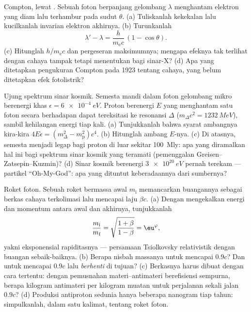 \begin{exercise}[$\star\star\star$]\label{exo:b3:relativistic-dynamics:10}
Compton, lewat . Sebuah foton berpanjang gelombang
$\lambda$ menghantam elektron yang diam lalu terhambur pada sudut
$\theta$. (a) Tuliskanlah kekekalan  lalu kucilkanlah
invarian elektron akhirnya. (b) Turunkanlah
\[
\lambda' - \lambda = \frac{h}{m_{\text{e}}c}\,(1 - \cos\theta) .
\]
(c) Hitunglah $h/m_{\text{e}}c$ dan pergeseran maksimumnya; mengapa
efeknya tak terlihat dengan cahaya tampak tetapi menentukan bagi
sinar-X? (d) Apa yang ditetapkan pengukuran Compton pada 1923 tentang
cahaya, yang belum ditetapkan efek fotolistrik?
\end{exercise}

\begin{exercise}[$\star\star\star$]\label{exo:b3:relativistic-dynamics:11}
Ujung spektrum sinar kosmik. Semesta mandi dalam foton gelombang mikro
berenergi khas $\epsilon = \qty{6e-4}{eV}$. Proton berenergi $E$ yang
menghantam satu foton secara berhadapan dapat tereksitasi ke resonansi
$\Delta$ ($m_\Delta c^2 = \qty{1232}{MeV}$), sambil kehilangan energi
tiap kali. (a) Tunjukkanlah bahwa syarat ambangnya kira-kira $4E\epsilon =
(m_\Delta^2 - m_{\text{p}}^2)c^4$. (b) Hitunglah ambang $E$-nya.
(c) Di atasnya, semesta menjadi legap bagi proton di luar sekitar
\qty{100}{Mly}: apa yang diramalkan hal ini bagi spektrum sinar kosmik
yang teramati (pemenggalan Greisen--Zatsepin--Kuzmin)? (d) Sinar kosmik
berenergi $\qty{3e20}{eV}$ pernah terekam --- partikel ``Oh-My-God'':
apa yang dituntut keberadaannya dari sumbernya?
\end{exercise}

\begin{exercise}[$\star\star\star$]\label{exo:b3:relativistic-dynamics:12}
Roket foton. Sebuah roket bermassa awal $m_{\text{i}}$ memancarkan
buangannya sebagai berkas cahaya terkolimasi lalu mencapai laju $\beta c$.
(a) Dengan mengekalkan energi dan momentum antara awal dan akhirnya,
tunjukkanlah
\[
\frac{m_{\text{i}}}{m_{\text{f}}} =
\sqrt{\frac{1 + \beta}{1 - \beta}} = \eu^{\varphi} ,
\]
yakni eksponensial rapiditasnya --- persamaan Tsiolkovsky relativistik
dengan buangan sebaik-baiknya. (b) Berapa nisbah massanya untuk
mencapai $0.9c$? Dan untuk mencapai $0.9c$ lalu \emph{berhenti} di
tujuan? (c) Berkasnya harus dibuat dengan cara tertentu: dengan
pemusnahan materi--antimateri berefisiensi sempurna, berapa kilogram
antimateri per kilogram muatan untuk perjalanan sekali jalan $0.9c$?
(d) Produksi antiproton sedunia hanya beberapa nanogram tiap tahun:
simpulkanlah, dalam satu kalimat, tentang roket foton.
\end{exercise}


